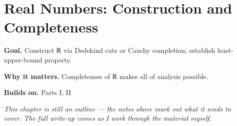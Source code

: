 \chapter{Real Numbers: Construction and Completeness}
\label{ch:07-real-analysis-and-measure-theory-01}

\begin{chapterintro}
\textbf{Goal.} Construct ℝ via Dedekind cuts or Cauchy completion; establish least-upper-bound property.

\textbf{Why it matters.} Completeness of ℝ makes all of analysis possible.

\textbf{Builds on.} Parts I, II
\end{chapterintro}

\textit{This chapter is still an outline --- the notes above mark out what it needs to cover. The full write-up comes as I work through the material myself.}

